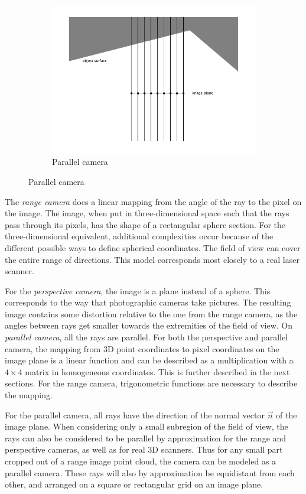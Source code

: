 \begin{figure}[H]
\begin{subfigure}{.33\textwidth}
	\includegraphics[trim=8mm 1cm 8mm 1cm, crop, width=\linewidth]{fig/cam_parallel.pdf}
	\caption{Parallel camera}
\end{subfigure}
\end{figure}

The \emph{range camera} does a linear mapping from the angle of the ray to the pixel on the image. The image, when put in three-dimensional space such that the rays pass through its pixels, has the shape of a rectangular sphere section. For the three-dimensional equivalent, additional complexities occur because of the different possible ways to define spherical coordinates. The field of view can cover the entire range of directions. This model corresponds most closely to a real laser scanner.

For the \emph{perspective camera}, the image is a plane instead of a sphere. This corresponds to the way that photographic cameras take pictures. The resulting image contains some distortion relative to the one from the range camera, as the angles between rays get smaller towards the extremities of the field of view. On \emph{parallel camera}, all the rays are parallel. For both the perspective and parallel camera, the mapping from 3D point coordinates to pixel coordinates on the image plane is a linear function and can be described as a multiplication with a $4 \times 4$ matrix in homogeneous coordinates. This is further described in the next sections. For the range camera, trigonometric functions are necessary to describe the mapping.

For the parallel camera, all rays have the direction of the normal vector $\vec{n}$ of the image plane. When considering only a small subregion of the field of view, the rays can also be considered to be parallel by approximation for the range and perspective cameras, as well as for real 3D scanners. Thus for any small part cropped out of a range image point cloud, the camera can be modeled as a parallel camera. These rays will also by approximation be equidistant from each other, and arranged on a square or rectangular grid on an image plane.

